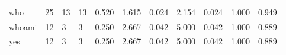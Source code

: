 \begin{longtable}{lp{1.2cm}p{1.2cm}p{1.2cm}p{1.2cm}p{1.2cm}p{1.2cm}p{1.2cm}p{1.2cm}p{1.2cm}p{1.2cm}}
who       &                           25 &                 13 &                                13 &                                      0.520 &                                  1.615 &                                        0.024 &                             2.154 &                                   0.024 &                              1.000 &                                              0.949 \\
whoami    &                           12 &                  3 &                                 3 &                                      0.250 &                                  2.667 &                                        0.042 &                             5.000 &                                   0.042 &                              1.000 &                                              0.889 \\
yes       &                           12 &                  3 &                                 3 &                                      0.250 &                                  2.667 &                                        0.042 &                             5.000 &                                   0.042 &                              1.000 &                                              0.889 \\
\end{longtable}
